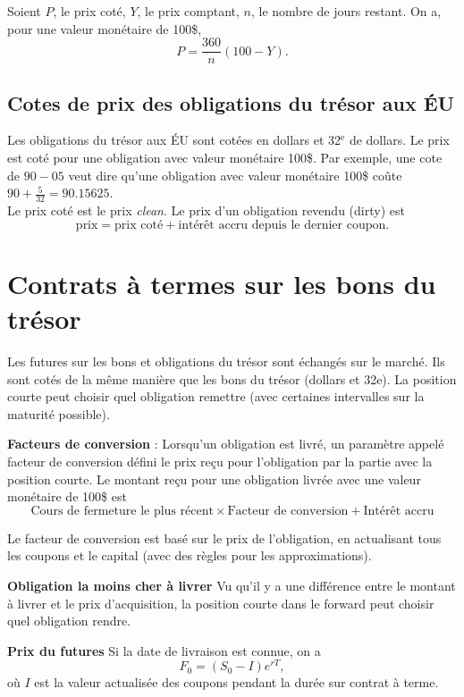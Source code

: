 Soient $P$, le prix coté, $Y$, le prix comptant, $n$, le nombre de jours restant. On a, pour une valeur monétaire de 100\$,  
$$P = \frac{360}{n}(100 - Y).$$

\subsection{Cotes de prix des obligations du trésor aux ÉU}

Les obligations du trésor aux ÉU sont cotées en dollars et 32${}^{\text{e}}$ de dollars. Le prix est coté pour une obligation avec valeur monétaire 100\$. Par exemple, une cote de $90-05$ veut dire qu'une obligation avec valeur monétaire 100\$ coûte $90 + \frac{5}{32} = 90.15625$. \\

Le prix coté est le prix \textit{clean}. Le prix d'un obligation revendu (dirty) est 
$$\text{prix} = \text{prix coté} + \text{intérêt accru depuis le dernier coupon}.$$

\section{Contrats à termes sur les bons du trésor}

Les futures sur les bons et obligations du trésor sont échangés sur le marché. Ils sont cotés de la même manière que les bons du trésor (dollars et 32e). La position courte peut choisir quel obligation remettre (avec certaines intervalles sur la maturité possible).

\textbf{Facteurs de conversion} : Lorsqu'un obligation est livré, un paramètre appelé facteur de conversion défini le prix reçu pour l'obligation par la partie avec la position courte. Le montant reçu pour une obligation livrée avec une valeur monétaire de 100\$ est 
$$\text{Cours de fermeture le plus récent} \times \text{Facteur de conversion} + \text{Intérêt accru}$$

Le facteur de conversion est basé sur le prix de l'obligation, en actualisant tous les coupons et le capital (avec des règles pour les approximations). 

\textbf{Obligation la moins cher à livrer} Vu qu'il y a une différence entre le montant à livrer et le prix d'acquisition, la position courte dans le forward peut choisir quel obligation rendre. 

\textbf{Prix du futures} Si la date de livraison est connue, on a 
$$F_0 = (S_0 - I)e^{rT},$$
où $I$ est la valeur actualisée des coupons pendant la durée sur contrat à terme. 


